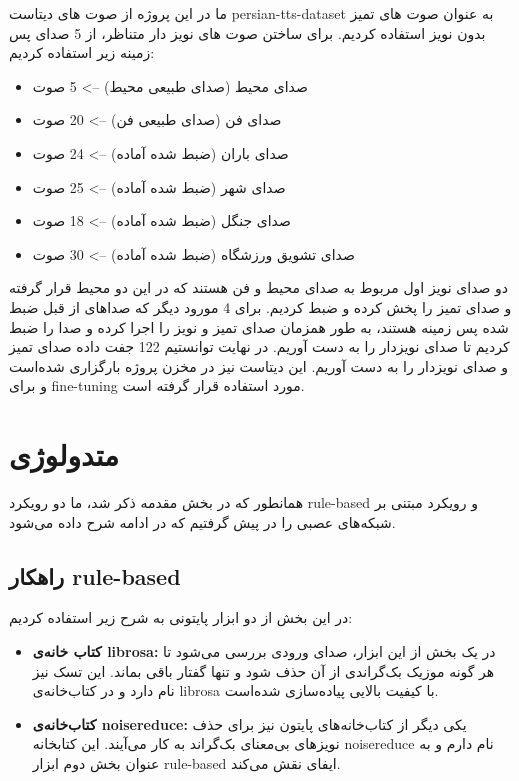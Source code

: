 \documentclass[fleqn]{report}
\begin{document}
ما در این پروژه از صوت های دیتاست persian-tts-dataset به عنوان صوت های تمیز بدون نویز استفاده کردیم. برای ساختن صوت های نویز دار متناظر، از 5 صدای پس زمینه زیر استفاده کردیم:
\begin{itemize}
    \item صدای محیط (صدای طبیعی محیط) --> 5 صوت
    \item صدای فن (صدای طبیعی فن) --> 20 صوت
    \item صدای باران (ضبط شده آماده) --> 24 صوت
    \item صدای شهر (ضبط شده آماده) --> 25 صوت
    \item صدای جنگل (ضبط شده آماده) --> 18 صوت
    \item صدای تشویق ورزشگاه (ضبط شده آماده) --> 30 صوت
\end{itemize}

دو صدای نویز اول مربوط به صدای محیط و فن هستند که در این دو محیط قرار گرفته و صدای تمیز را پخش کرده و ضبط کردیم. برای 4 مورود دیگر که صداهای از قبل ضبط شده پس زمینه هستند، به طور همزمان صدای تمیز و نویز را اجرا کرده و صدا را ضبط کردیم تا صدای نویزدار را به دست آوریم. در نهایت توانستیم 122 جفت داده صدای تمیز و صدای نویزدار را به دست آوریم.
این دیتاست نیز در مخزن پروژه بارگزاری شده‌است و برای fine-tuning مورد استفاده قرار گرفته است.

\chapter{متدولوژی}
همانطور که در بخش مقدمه ذکر شد، ما دو رویکرد rule-based و رویکرد مبتنی بر شبکه‌های عصبی را در پیش گرفتیم که در ادامه شرح داده می‌شود.

\section{راهکار rule-based}
در این بخش از دو ابزار پایتونی به شرح زیر استفاده کردیم:
\begin{itemize}
    \item \textbf{کتاب خانه‌ی librosa:} در یک بخش از این ابزار، صدای ورودی بررسی می‌شود تا هر گونه موزیک بک‌گراندی از آن حذف شود و تنها گفتار باقی بماند. این تسک  نیز نام دارد و در کتاب‌خانه‌ی librosa با کیفیت بالایی پیاده‌سازی شده‌است.
    \item \textbf{کتاب‌خانه‌ی noisereduce:} یکی دیگر از کتاب‌خانه‌های پایتون نیز برای حذف نویز‌های بی‌معنای بک‌گراند به کار می‌آیند. این کتابخانه noisereduce نام دارم و به عنوان بخش دوم ابزار rule-based ایفای نقش می‌کند.
\end{itemize}
\end{document}
